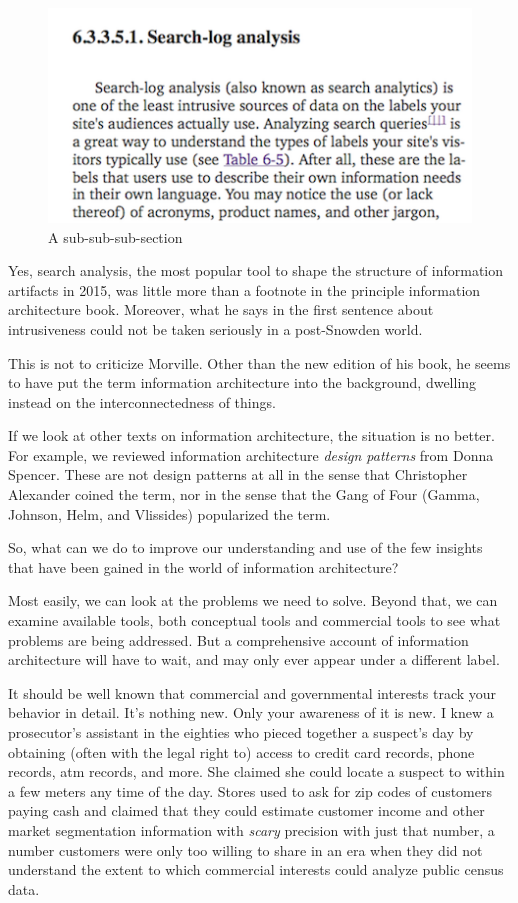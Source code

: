 \begin{figure}
\begin{center}
\includegraphics[height=0.36\linewidth,width=0.79\linewidth]{fiSearchAnal.png}
\caption{A sub-sub-sub-section}
\label{fig:fiSearchAnal.png}
\end{center}
\end{figure}

\noindent Yes, search analysis, the most popular tool to shape the
structure of information artifacts in 2015, was little more than a
footnote in the principle information architecture book. Moreover, what
he says in the first sentence about intrusiveness could not be taken
seriously in a post-Snowden world.

This is not to criticize Morville. Other than the new edition of his
book, he seems to have put the term information architecture into the
background, dwelling instead on the interconnectedness of things.

If we look at other texts on information architecture, the situation is
no better. For example, we reviewed information architecture
\emph{design patterns} from Donna Spencer. These are not design patterns
at all in the sense that Christopher Alexander coined the term, nor in
the sense that the Gang of Four (Gamma, Johnson, Helm, and Vlissides)
popularized the term.

So, what can we do to improve our understanding and use of the few
insights that have been gained in the world of information architecture?

Most easily, we can look at the problems we need to solve. Beyond that,
we can examine available tools, both conceptual tools and commercial
tools to see what problems are being addressed. But a comprehensive
account of information architecture will have to wait, and may only ever
appear under a different label.

\hypertarget{analytics}{%
\label{analytics}}

It should be well known that commercial and governmental interests track
your behavior in detail. It's nothing new. Only your awareness of it is
new. I knew a prosecutor's assistant in the eighties who pieced together
a suspect's day by obtaining (often with the legal right to) access to
credit card records, phone records, atm records, and more. She claimed
she could locate a suspect to within a few meters any time of the day.
Stores used to ask for zip codes of customers paying cash and claimed
that they could estimate customer income and other market segmentation
information with \emph{scary} precision with just that number, a number
customers were only too willing to share in an era when they did not
understand the extent to which commercial interests could analyze public
census data.

